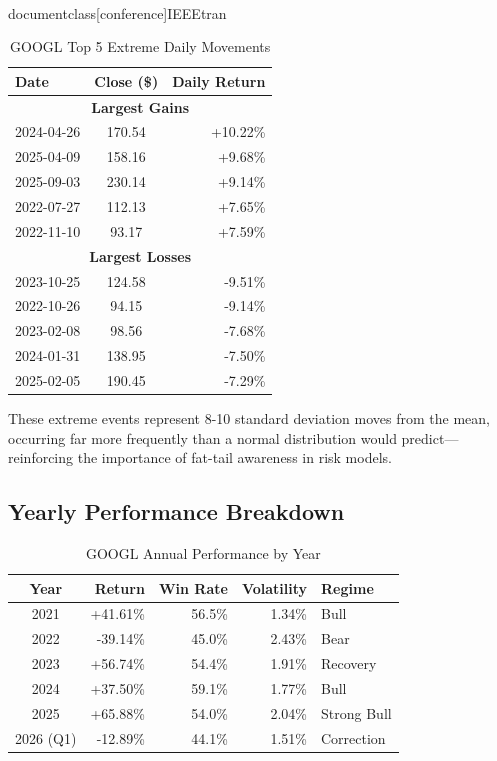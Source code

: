 \\documentclass[conference]{IEEEtran}
\begin{document}
\begin{table}[H]
\caption{GOOGL Top 5 Extreme Daily Movements}
\begin{center}
\begin{tabular}{|l|c|r|}
\hline
\textbf{Date} & \textbf{Close (\$)} & \textbf{Daily Return} \\
\hline
\multicolumn{3}{|c|}{\textbf{Largest Gains}} \\
\hline
2024-04-26 & 170.54 & +10.22\% \\
\hline
2025-04-09 & 158.16 & +9.68\% \\
\hline
2025-09-03 & 230.14 & +9.14\% \\
\hline
2022-07-27 & 112.13 & +7.65\% \\
\hline
2022-11-10 & 93.17 & +7.59\% \\
\hline
\multicolumn{3}{|c|}{\textbf{Largest Losses}} \\
\hline
2023-10-25 & 124.58 & -9.51\% \\
\hline
2022-10-26 & 94.15 & -9.14\% \\
\hline
2023-02-08 & 98.56 & -7.68\% \\
\hline
2024-01-31 & 138.95 & -7.50\% \\
\hline
2025-02-05 & 190.45 & -7.29\% \\
\hline
\end{tabular}
\label{tab:googl_extremes}
\end{center}
\end{table}

These extreme events represent 8-10 standard deviation moves from the mean, occurring far more frequently than a normal distribution would predict---reinforcing the importance of fat-tail awareness in risk models.

\subsection{Yearly Performance Breakdown}

\begin{table}[H]
\caption{GOOGL Annual Performance by Year}
\begin{center}
\begin{tabular}{|c|r|r|r|l|}
\hline
\textbf{Year} & \textbf{Return} & \textbf{Win Rate} & \textbf{Volatility} & \textbf{Regime} \\
\hline
2021 & +41.61\% & 56.5\% & 1.34\% & Bull \\
\hline
2022 & -39.14\% & 45.0\% & 2.43\% & Bear \\
\hline
2023 & +56.74\% & 54.4\% & 1.91\% & Recovery \\
\hline
2024 & +37.50\% & 59.1\% & 1.77\% & Bull \\
\hline
2025 & +65.88\% & 54.0\% & 2.04\% & Strong Bull \\
\hline
2026 (Q1) & -12.89\% & 44.1\% & 1.51\% & Correction \\
\hline
\end{tabular}
\label{tab:googl_yearly}
\end{center}
\end{table}
\end{document}
